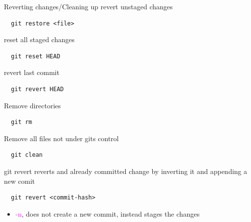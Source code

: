 \documentclass{beamer}
\begin{document}
\begin{frame}[fragile,t]{Reverting changes/Cleaning up}\vspace{10pt}
  revert unstaged changes
  \begin{lstlisting}
  git restore <file>\end{lstlisting}\vspace{10pt}

  reset all staged changes
  \begin{lstlisting}
  git reset HEAD \end{lstlisting}\vspace{10pt}
  
  revert last commit
  \begin{lstlisting}
  git revert HEAD\end{lstlisting}\vspace{10pt}
  
  Remove directories
  \begin{lstlisting}
  git rm\end{lstlisting}\vspace{10pt}
  
  Remove all files not under gits control
  \begin{lstlisting}
  git clean\end{lstlisting}\vspace{10pt}
\end{frame}

\begin{frame}[fragile,t]{git revert}\vspace{10pt}
  reverts and already committed change by inverting it and appending a new comit
  \begin{lstlisting}
  git revert <commit-hash>\end{lstlisting}\vspace{10pt}
  \begin{itemize}
    \item \textcolor{magenta}{-n}, does not create a new commit, instead stages the changes
  \end{itemize} 
\end{frame}
\end{document}
